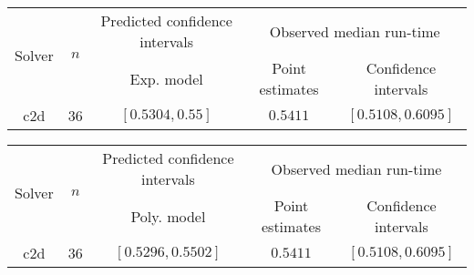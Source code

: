 \begin{tabular}{ccccc}
\hline 
\multirow{2}{*}{Solver} & \multirow{2}{*}{$n$} & Predicted confidence intervals & \multicolumn{2}{c}{Observed median  run-time}\tabularnewline
 &  & Exp. model  & Point estimates  & Confidence intervals\tabularnewline
\hline 
\hline 
\multirow{0}{*}{c2d} & 36 & $\mathbf{\left[0.5304,0.55\right]}$ & $0.5411$ & $\left[0.5108,0.6095\right]$ \tabularnewline 
\hline 
\end{tabular} 

\begin{tabular}{ccccc}
\hline 
\multirow{2}{*}{Solver} & \multirow{2}{*}{$n$} & Predicted confidence intervals & \multicolumn{2}{c}{Observed median  run-time}\tabularnewline
 &  & Poly. model  & Point estimates  & Confidence intervals\tabularnewline
\hline 
\hline 
\multirow{0}{*}{c2d} & 36 & $\mathbf{\left[0.5296,0.5502\right]}$ & $0.5411$ & $\left[0.5108,0.6095\right]$ \tabularnewline 
\hline 
\end{tabular} 



